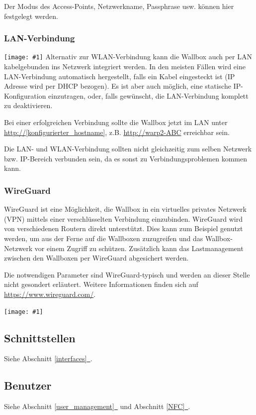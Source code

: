 \documentclass[a4paper,10pt]{article}
\newcommand{\hint}[1]{\begin{tcolorbox}[colback=boxgray,colframe=black,coltext=
white,title=Hinweis,left*=2mm,right*=2mm,boxsep=1mm,bottom=1mm,top=1mm]#1\end{tcolorbox}}
\newcommand{\gfx}[1]{\texttt{[image: \#1]}}
\newcommand*{\fullref}[1]{Abschnitt \hyperref[{#1}]{\ref*{#1}~\nameref*{#1}}}
\begin{document}
\begin{multicols*}{2}
    Der Modus des Access-Points, Netzwerkname, Passphrase usw. können hier festgelegt werden.

    \subsubsection{LAN-Verbindung}
    \gfx{./img_warp2/resized/web_ethernet}
    Alternativ zur WLAN-Verbindung kann die Wallbox auch per LAN kabelgebunden
    ins Netzwerk integriert werden. In den meisten Fällen wird eine
    LAN-Verbindung automatisch hergestellt, falls ein Kabel eingesteckt ist
    (IP Adresse wird per DHCP bezogen). Es ist aber auch möglich,
    eine statische IP-Konfiguration    einzutragen, oder, falls gewünscht, die LAN-Verbindung
    komplett zu deaktivieren.

    Bei einer erfolgreichen Verbindung sollte die Wallbox jetzt im LAN unter
    \url{http://[konfigurierter_hostname]}, z.B. \url{http://warp2-ABC} erreichbar sein.

    \hint{Die LAN- und WLAN-Verbindung sollten nicht gleichzeitig zum selben Netzwerk bzw. IP-Bereich verbunden sein,
    da es sonst zu Verbindungsproblemen kommen kann.}

    \subsubsection{WireGuard}

    WireGuard ist eine Möglichkeit, die Wallbox in ein virtuelles privates Netzwerk (VPN)
    mittels einer verschlüsselten Verbindung einzubinden. WireGuard wird von
    verschiedenen Routern direkt unterstützt. Dies kann zum Beispiel genutzt
    werden, um aus der Ferne auf die Wallboxen zuzugreifen und das
    Wallbox-Netzwerk vor einem Zugriff zu schützen. Zusätzlich kann das
    Lastmanagement zwischen den Wallboxen per WireGuard abgesichert werden.

    Die notwendigen Parameter sind WireGuard-typisch und werden an dieser Stelle
    nicht gesondert erläutert. Weitere Informationen finden sich auf
    \url{https://www.wireguard.com/}.

    \gfx{./img_warp2/resized/web_wireguard}

    \subsection{Schnittstellen}
    Siehe \fullref{interfaces}.

    \subsection{Benutzer}
    Siehe \fullref{user_management} und \fullref{NFC}.


\end{multicols*}
\end{document}
